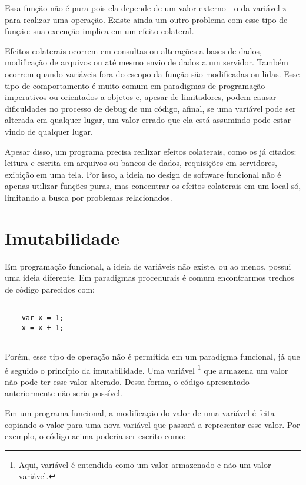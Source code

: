 Essa função não é pura pois ela depende de um 
valor externo - o da variável z - para realizar 
uma operação. Existe ainda um outro problema 
com esse tipo de função: sua execução implica em 
um efeito colateral.

Efeitos colaterais ocorrem em consultas ou 
alterações a bases de dados, modificação de 
arquivos ou até mesmo envio de dados a um 
servidor. Também ocorrem quando variáveis fora 
do escopo da função são modificadas ou lidas. 
Esse tipo de comportamento é muito comum em 
paradigmas de programação imperativos ou 
orientados a objetos e, apesar de limitadores, 
podem causar dificuldades no processo de 
debug de um código, afinal, se uma variável 
pode ser alterada em qualquer lugar, um 
valor errado que ela está assumindo pode 
estar vindo de qualquer lugar.

Apesar disso, um programa precisa realizar 
efeitos colaterais, como os já citados: 
leitura e escrita em arquivos ou bancos de 
dados, requisições em servidores, exibição em 
uma tela. Por isso, a ideia no design de software 
funcional não é apenas utilizar funções puras, 
mas concentrar os efeitos colaterais em um local 
só, limitando a busca por problemas relacionados.


\section{Imutabilidade}

Em programação funcional, a ideia de variáveis não 
existe, ou ao menos, possui uma ideia diferente. 
Em paradigmas procedurais é comum encontrarmos trechos 
de código parecidos com:

\begin{lstlisting}[caption={Exemplo de Código Mutável},label=mutablevar]

    var x = 1;
    x = x + 1;


\end{lstlisting}

Porém, esse tipo de operação não é permitida em um 
paradigma funcional, já que é seguido o princípio 
da imutabilidade. Uma variável \footnote{Aqui, 
variável é entendida como um valor armazenado 
e não um valor variável.} que armazena um valor 
não pode ter esse valor alterado. Dessa forma, 
o código apresentado anteriormente não seria 
possível.

Em um programa funcional, a modificação do valor 
de uma variável é feita copiando o valor para uma 
nova variável que passará a representar esse valor. 
Por exemplo, o código acima poderia ser escrito 
como:

